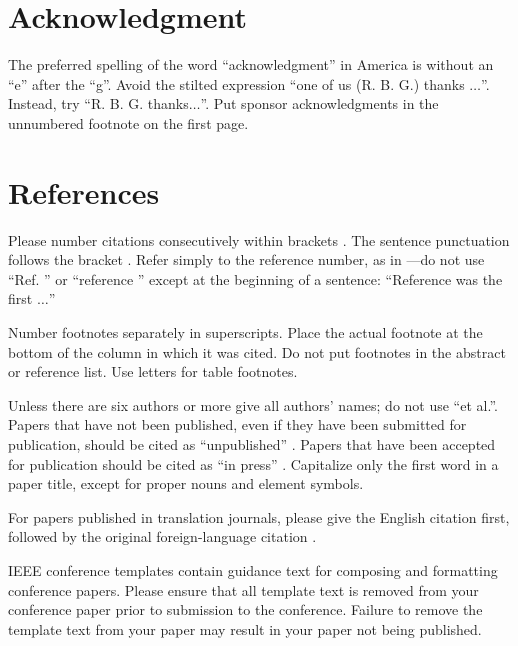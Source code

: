 \documentclass[conference]{IEEEtran}
\begin{document}
\section*{Acknowledgment}

The preferred spelling of the word ``acknowledgment'' in America is without 
an ``e'' after the ``g''. Avoid the stilted expression ``one of us (R. B. 
G.) thanks $\ldots$''. Instead, try ``R. B. G. thanks$\ldots$''. Put sponsor 
acknowledgments in the unnumbered footnote on the first page.

\section*{References}

Please number citations consecutively within brackets \cite{b1}. The 
sentence punctuation follows the bracket \cite{b2}. Refer simply to the reference 
number, as in \cite{b3}---do not use ``Ref. \cite{b3}'' or ``reference \cite{b3}'' except at 
the beginning of a sentence: ``Reference \cite{b3} was the first $\ldots$''

Number footnotes separately in superscripts. Place the actual footnote at 
the bottom of the column in which it was cited. Do not put footnotes in the 
abstract or reference list. Use letters for table footnotes.

Unless there are six authors or more give all authors' names; do not use 
``et al.''. Papers that have not been published, even if they have been 
submitted for publication, should be cited as ``unpublished'' \cite{b4}. Papers 
that have been accepted for publication should be cited as ``in press'' \cite{b5}. 
Capitalize only the first word in a paper title, except for proper nouns and 
element symbols.

For papers published in translation journals, please give the English 
citation first, followed by the original foreign-language citation \cite{b6}.
	



\vspace{12pt}
\color{red}
IEEE conference templates contain guidance text for composing and formatting conference papers. Please ensure that all template text is removed from your conference paper prior to submission to the conference. Failure to remove the template text from your paper may result in your paper not being published.
\end{document}
